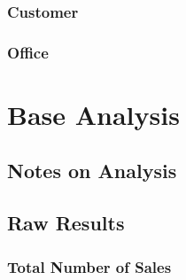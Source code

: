 \documentclass{article}
\begin{document}
            \subsubsection{Customer}

            \subsubsection{Office}

    \section{Base Analysis}
    \label{sec:BA}

        \subsection{Notes on Analysis}

            \subsection{Raw Results}


            \subsubsection{Total Number of Sales}
\end{document}
